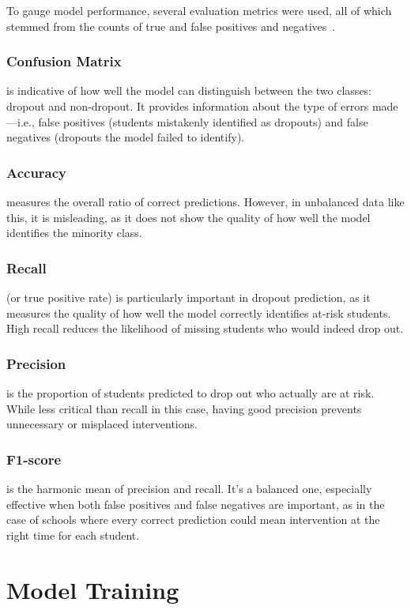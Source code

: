 \documentclass[runningheads]{llncs}
\begin{document}
To gauge model performance, several evaluation metrics were used, all of which stemmed from the counts of true and false positives and negatives~\cite{google_classification_metrics}.

\subsubsection{Confusion Matrix} is indicative of how well the model can distinguish between the two classes: dropout and non-dropout. It provides information about the type of errors made—i.e., false positives (students mistakenly identified as dropouts) and false negatives (dropouts the model failed to identify).

\subsubsection{Accuracy} measures the overall ratio of correct predictions. However, in unbalanced data like this, it is misleading, as it does not show the quality of how well the model identifies the minority class.

\subsubsection{Recall} (or true positive rate) is particularly important in dropout prediction, as it measures the quality of how well the model correctly identifies at-risk students. High recall reduces the likelihood of missing students who would indeed drop out.

\subsubsection{Precision} is the proportion of students predicted to drop out who actually are at risk. While less critical than recall in this case, having good precision prevents unnecessary or misplaced interventions.

\subsubsection{F1-score} is the harmonic mean of precision and recall. It's a balanced one, especially effective when both false positives and false negatives are important, as in the case of schools where every correct prediction could mean intervention at the right time for each student.


\section{Model Training}
\end{document}
